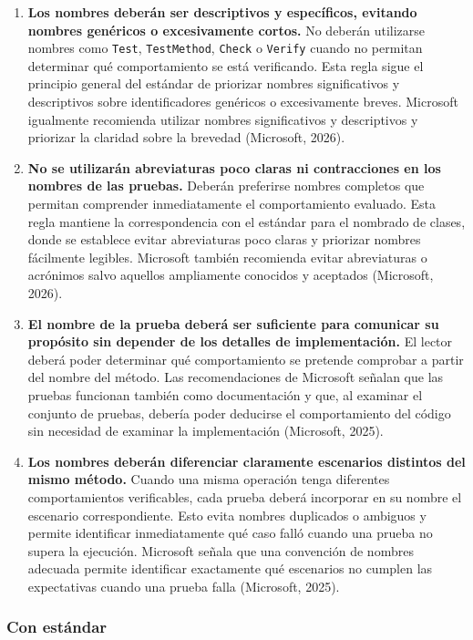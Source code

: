 \begin{enumerate}
\item \textbf{Los nombres deberán ser descriptivos y específicos, evitando nombres genéricos o excesivamente cortos.} No deberán utilizarse nombres como \texttt{Test}, \texttt{TestMethod}, \texttt{Check} o \texttt{Verify} cuando no permitan determinar qué comportamiento se está verificando. Esta regla sigue el principio general del estándar de priorizar nombres significativos y descriptivos sobre identificadores genéricos o excesivamente breves. Microsoft igualmente recomienda utilizar nombres significativos y descriptivos y priorizar la claridad sobre la brevedad (Microsoft, 2026).

\item \textbf{No se utilizarán abreviaturas poco claras ni contracciones en los nombres de las pruebas.} Deberán preferirse nombres completos que permitan comprender inmediatamente el comportamiento evaluado. Esta regla mantiene la correspondencia con el estándar para el nombrado de clases, donde se establece evitar abreviaturas poco claras y priorizar nombres fácilmente legibles. Microsoft también recomienda evitar abreviaturas o acrónimos salvo aquellos ampliamente conocidos y aceptados (Microsoft, 2026).

\item \textbf{El nombre de la prueba deberá ser suficiente para comunicar su propósito sin depender de los detalles de implementación.} El lector deberá poder determinar qué comportamiento se pretende comprobar a partir del nombre del método. Las recomendaciones de Microsoft señalan que las pruebas funcionan también como documentación y que, al examinar el conjunto de pruebas, debería poder deducirse el comportamiento del código sin necesidad de examinar la implementación (Microsoft, 2025).

\item \textbf{Los nombres deberán diferenciar claramente escenarios distintos del mismo método.} Cuando una misma operación tenga diferentes comportamientos verificables, cada prueba deberá incorporar en su nombre el escenario correspondiente. Esto evita nombres duplicados o ambiguos y permite identificar inmediatamente qué caso falló cuando una prueba no supera la ejecución. Microsoft señala que una convención de nombres adecuada permite identificar exactamente qué escenarios no cumplen las expectativas cuando una prueba falla (Microsoft, 2025).

\end{enumerate}

\subsubsection{Con estándar}

